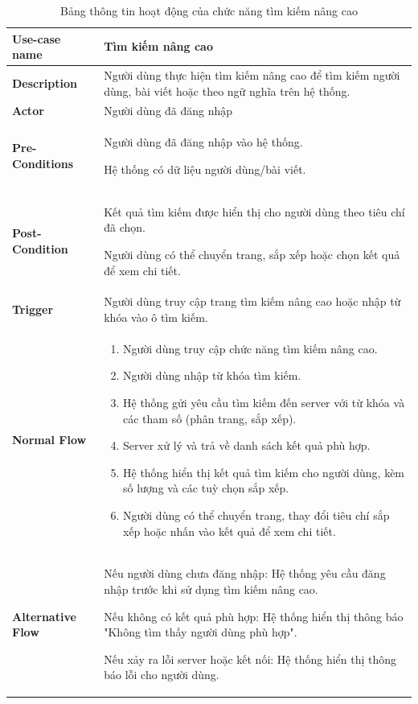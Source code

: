 \begin{longtable}{|>{\bfseries}m{4cm}|m{10cm}|}
\caption{Bảng thông tin hoạt động của chức năng tìm kiếm nâng cao}
\label{table:usecase-search}\\
\hline
Use-case name & Tìm kiếm nâng cao
\\
\hline
Description & Người dùng thực hiện tìm kiếm nâng cao để tìm kiếm người dùng, bài viết hoặc theo ngữ nghĩa trên hệ thống.\\
\hline
Actor & Người dùng đã đăng nhập
\\
\hline
Pre-Conditions & Người dùng đã đăng nhập vào hệ thống.

Hệ thống có dữ liệu người dùng/bài viết.\\
\hline
Post-Condition & Kết quả tìm kiếm được hiển thị cho người dùng theo tiêu chí đã chọn.

Người dùng có thể chuyển trang, sắp xếp hoặc chọn kết quả để xem chi tiết.\\
\hline
Trigger & Người dùng truy cập trang tìm kiếm nâng cao hoặc nhập từ khóa vào ô tìm kiếm.
\\
\hline
Normal Flow &
\begin{enumerate}
    \item Người dùng truy cập chức năng tìm kiếm nâng cao.
    \item Người dùng nhập từ khóa tìm kiếm.
    \item Hệ thống gửi yêu cầu tìm kiếm đến server với từ khóa và các tham số (phân trang, sắp xếp).
    \item Server xử lý và trả về danh sách kết quả phù hợp.
    \item Hệ thống hiển thị kết quả tìm kiếm cho người dùng, kèm số lượng và các tuỳ chọn sắp xếp.
    \item Người dùng có thể chuyển trang, thay đổi tiêu chí sắp xếp hoặc nhấn vào kết quả để xem chi tiết.
\end{enumerate} \\
\hline
Alternative Flow & Nếu người dùng chưa đăng nhập: Hệ thống yêu cầu đăng nhập trước khi sử dụng tìm kiếm nâng cao.


Nếu không có kết quả phù hợp: Hệ thống hiển thị thông báo "Không tìm thấy người dùng phù hợp".


Nếu xảy ra lỗi server hoặc kết nối: Hệ thống hiển thị thông báo lỗi cho người dùng.\\
\hline
\end{longtable}

